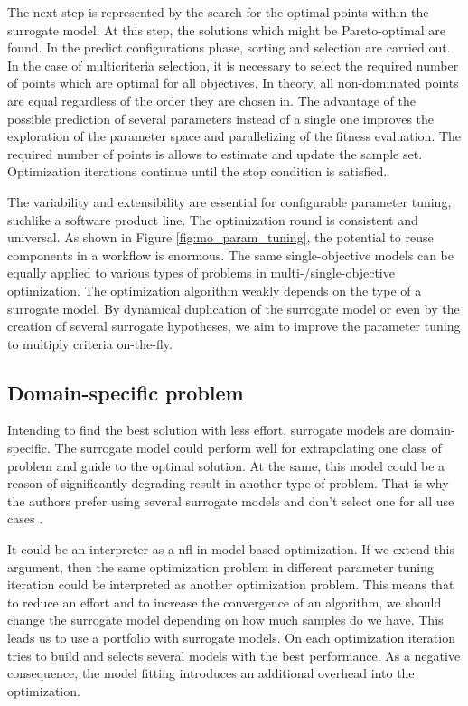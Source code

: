             The next step is represented by the search for the optimal points within the surrogate model. At this step, the solutions which might be Pareto-optimal are found. In the predict configurations phase, sorting and selection are carried out. In the case of multicriteria selection, it is necessary to select the required number of points which are optimal for all objectives. In theory, all non-dominated points are equal regardless of the order they are chosen in. The advantage of the possible prediction of several parameters instead of a single one improves the exploration of the parameter space and parallelizing of the fitness evaluation. The required number of points is allows to estimate and update the sample set. Optimization iterations continue until the stop condition is satisfied.
    
            The variability and extensibility are essential for configurable parameter tuning, suchlike a software product line. The optimization round is consistent and universal. As shown in Figure \ref{fig:mo_param_tuning}, the potential to reuse components in a workflow is enormous. The same single-objective models can be equally applied to various types of problems in multi-/single-objective optimization. The optimization algorithm weakly depends on the type of a surrogate model. By dynamical duplication of the surrogate model or even by the creation of several surrogate hypotheses, we aim to improve the parameter tuning to multiply criteria on-the-fly.

        \subsection{Domain-specific problem}
        Intending to find the best solution with less effort, surrogate models are domain-specific. The surrogate model could perform well for extrapolating one class of problem and guide to the optimal solution. At the same, this model could be a reason of significantly degrading result in another type of problem. That is why the authors prefer using several surrogate models and don't select one for all use cases \cite{SoftSurvey}.

        It could be an interpreter as a \Gls{nfl} in model-based optimization. If we extend this argument, then the same optimization problem in different parameter tuning iteration could be interpreted as another optimization problem. This means that to reduce an effort and to increase the convergence of an algorithm, we should change the surrogate model depending on how much samples do we have. 
        This leads us to use a portfolio with surrogate models. On each optimization iteration tries to build and selects several models with the best performance. As a negative consequence, the model fitting introduces an additional overhead into the optimization.



